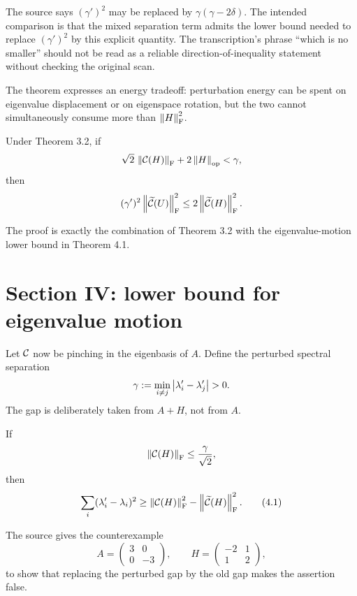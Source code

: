 The source says $(\gamma')^2$ may be replaced by $\gamma(\gamma-2\delta)$. The intended comparison is that the mixed separation term admits the lower bound needed to replace $(\gamma')^2$ by this explicit quantity. The transcription's phrase ``which is no smaller'' should not be read as a reliable direction-of-inequality statement without checking the original scan.

The theorem expresses an energy tradeoff: perturbation energy can be spent on eigenvalue displacement or on eigenspace rotation, but the two cannot simultaneously consume more than $\left\lVert H\right\rVert_{\mathrm{F}}^2$.

\begin{theorem}[Davis 3.3]
Under Theorem 3.2, if
\[
  \sqrt2\,\left\lVert \mathcal{C}(H)\right\rVert_{\mathrm{F}}+2\left\lVert H\right\rVert_{\mathrm{op}}<\gamma,
\]
then
\[
  (\gamma')^2\left\lVert \widetilde{\mathcal{C}}(U)\right\rVert_{\mathrm{F}}^2
  \le2\left\lVert \widetilde{\mathcal{C}}(H)\right\rVert_{\mathrm{F}}^2.
\]
\end{theorem}
The proof is exactly the combination of Theorem 3.2 with the eigenvalue-motion lower bound in Theorem 4.1.

\section{Section IV: lower bound for eigenvalue motion}


Let $\mathcal{C}$ now be pinching in the eigenbasis of $A$. Define the perturbed spectral separation
\[
  \gamma:=\min_{i\ne j}\left\lvert \lambda'_i-\lambda'_j\right\rvert>0.
\]
The gap is deliberately taken from $A+H$, not from $A$.

\begin{theorem}[Davis 4.1]
If
\[
  \left\lVert \mathcal{C}(H)\right\rVert_{\mathrm{F}}\le\frac{\gamma}{\sqrt2},
\]
then
\begin{equation}
  \sum_i(\lambda'_i-\lambda_i)^2
  \ge
  \left\lVert \mathcal{C}(H)\right\rVert_{\mathrm{F}}^2-
  \left\lVert \widetilde{\mathcal{C}}(H)\right\rVert_{\mathrm{F}}^2. \tag{4.1}
\end{equation}
\end{theorem}

The source gives the counterexample
\[
  A=\begin{pmatrix}3&0\\0&-3\end{pmatrix},
  \qquad
  H=\begin{pmatrix}-2&1\\1&2\end{pmatrix},
\]
to show that replacing the perturbed gap by the old gap makes the assertion false.

